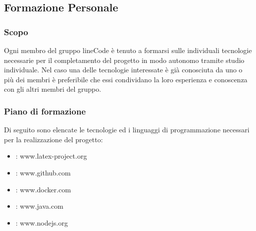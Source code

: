 
\subsection{Formazione Personale}

	\subsubsection{Scopo}
	Ogni membro del gruppo lineCode è tenuto a formarsi sulle individuali tecnologie necessarie per il completamento del progetto in modo autonomo tramite studio individuale. Nel caso una delle tecnologie interessate è già conosciuta da uno o più dei membri è preferibile che essi condividano la loro esperienza e conoscenza con gli altri membri del gruppo.
	
	\subsubsection{Piano di formazione}
	Di seguito sono elencate le tecnologie ed i linguaggi di programmazione necessari per la realizzazione del progetto:
	\begin{itemize}
		\item \glock{\LaTeX} : www.latex-project.org
		\item {} : www.github.com
		\item {} : www.docker.com
		\item {} : www.java.com
		\item {} : www.nodejs.org
	\end{itemize}

